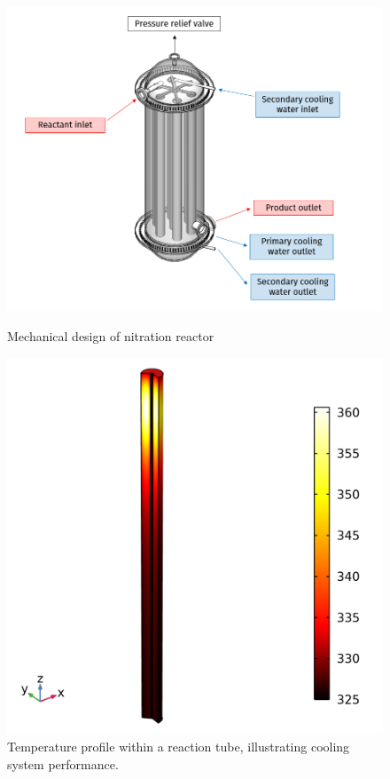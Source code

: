 \begin{figure}[h]
    \centering
    \begin{minipage}[t]{0.53\linewidth}
        \includegraphics[width=\linewidth]{figures/FYD executive sum.PNG}
        \caption{Mechanical design of nitration reactor}
        \label{fig:executivesummaryreactor}
    \end{minipage}\hfill
    \begin{minipage}[t]{0.42\linewidth}
        \includegraphics[width=\linewidth]{chapters/2-reaction/figures/temperature-surface.png}
        \caption{Temperature profile within a reaction tube, illustrating cooling system performance.}
        \label{fig:reactor-comsol}
    \end{minipage}
\end{figure}

